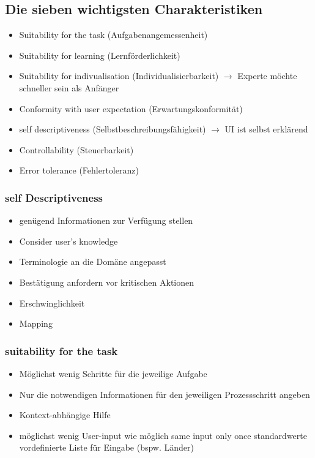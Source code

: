 \documentclass{report}
\theoremstyle{definition}
\theoremstyle{example}
\begin{document}
\subsection{Die sieben wichtigsten Charakteristiken}
\begin{itemize}
   \item Suitability for the task (Aufgabenangemessenheit)
   \item Suitability for learning (Lernförderlichkeit)
   \item Suitability for indivualisation (Individualisierbarkeit) $\rightarrow$ Experte möchte schneller sein als Anfänger
   \item Conformity with user expectation (Erwartungskonformität)
   \item self descriptiveness (Selbstbeschreibungsfähigkeit) $\rightarrow$ UI ist selbst erklärend
   \item Controllability (Steuerbarkeit)
   \item Error tolerance (Fehlertoleranz)
\end{itemize}

\subsubsection{self Descriptiveness}
\begin{itemize}
   \item genügend Informationen zur Verfügung stellen
   \item Consider user's knowledge
   \item Terminologie an die Domäne angepasst
   \item Bestätigung anfordern vor kritischen Aktionen
   \item Erschwinglichkeit
   \item Mapping
\end{itemize}

\subsubsection{suitability for the task}
\begin{itemize}
   \item Möglichst wenig Schritte für die jeweilige Aufgabe
   \item Nur die notwendigen Informationen für den jeweiligen Prozessschritt angeben
   \item Kontext-abhängige Hilfe
   \item möglichst wenig User-input wie möglich
   \subitem same input only once
   \subitem standardwerte
   \subitem vordefinierte Liste für Eingabe (bspw. Länder)
\end{itemize}
\end{document}
